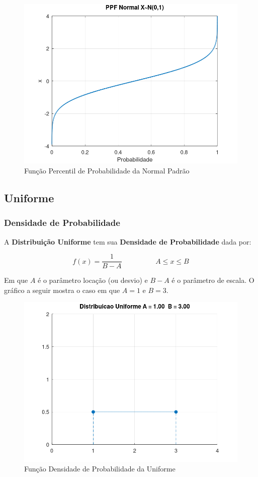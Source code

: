 \documentclass[
]{book}
\begin{document}
\begin{figure}

{\centering \includegraphics[width=0.5\linewidth]{images/normalppf} 

}

\caption{Função Percentil de Probabilidade da Normal Padrão}\label{fig:unnamed-chunk-3}
\end{figure}

\hypertarget{uniforme}{%
\subsection{Uniforme}\label{uniforme}}

\hypertarget{densidade-de-probabilidade-1}{%
\subsubsection*{Densidade de Probabilidade}\label{densidade-de-probabilidade-1}}

A \textbf{Distribuição Uniforme} tem sua \textbf{Densidade de Probabilidade} dada por:

\begin{equation}
f(x) = \frac{1}{B-A} \hspace{2cm} A \leq x \leq B 
\end{equation}

Em que \(A\) é o parâmetro locação (ou desvio) e \(B-A\) é o parâmetro de escala. O gráfico a seguir mostra o caso em que \(A = 1\) e \(B = 3\).

\begin{figure}

{\centering \includegraphics[width=0.5\linewidth]{images/uniformepdf} 

}

\caption{Função Densidade de Probabilidade da Uniforme}\label{fig:unnamed-chunk-4}
\end{figure}
\end{document}
